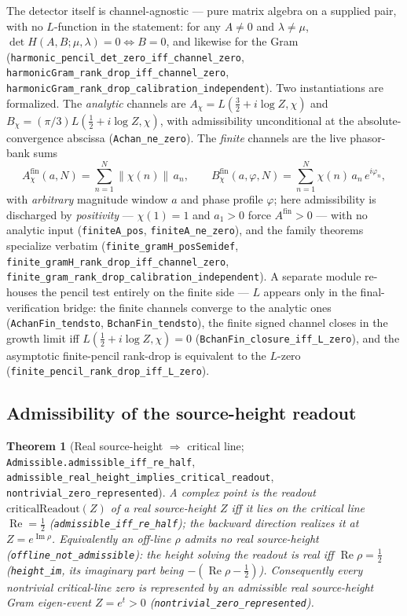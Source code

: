 \documentclass[11pt]{article}
\newtheorem{theorem}[definition]{Theorem}
\DeclareMathOperator{\Ree}{Re}
\DeclareMathOperator{\Imm}{Im}
\newcommand{\code}[1]{\texttt{#1}}
\begin{document}
The detector itself is channel-agnostic --- pure matrix algebra on a supplied pair, with no
$L$-function in the statement: for any $A\neq0$ and $\lambda\neq\mu$,
$\det H(A,B;\mu,\lambda)=0\iff B=0$, and likewise for the Gram
(\code{harmonic\_pencil\_det\_zero\_iff\_channel\_zero},
\code{harmonicGram\_rank\_drop\_iff\_channel\_zero},
\code{harmonicGram\_rank\_drop\_calibration\_independent}).  Two instantiations are formalized.
The \emph{analytic} channels are $A_\chi=L(\tfrac32+i\log Z,\chi)$ and
$B_\chi=(\pi/3)L(\tfrac12+i\log Z,\chi)$, with admissibility unconditional at the
absolute-convergence abscissa (\code{Achan\_ne\_zero}).  The \emph{finite} channels are the live
phasor-bank sums
\[
  A^{\mathrm{fin}}_{\chi}(a,N)=\sum_{n=1}^{N}\|\chi(n)\|\,a_n,\qquad
  B^{\mathrm{fin}}_{\chi}(a,\varphi,N)=\sum_{n=1}^{N}\chi(n)\,a_n\,e^{i\varphi_n},
\]
with \emph{arbitrary} magnitude window $a$ and phase profile $\varphi$; here admissibility is
discharged by \emph{positivity} --- $\chi(1)=1$ and $a_1>0$ force $A^{\mathrm{fin}}>0$ --- with no
analytic input (\code{finiteA\_pos}, \code{finiteA\_ne\_zero}), and the family theorems specialize
verbatim (\code{finite\_gramH\_posSemidef}, \code{finite\_gramH\_rank\_drop\_iff\_channel\_zero},
\code{finite\_gram\_rank\_drop\_calibration\_independent}).  A separate module re-houses the pencil
test entirely on the finite side --- $L$ appears only in the final-verification bridge: the finite
channels converge to the analytic ones (\code{AchanFin\_tendsto}, \code{BchanFin\_tendsto}), the
finite signed channel closes in the growth limit iff $L(\tfrac12+i\log Z,\chi)=0$
(\code{BchanFin\_closure\_iff\_L\_zero}), and the asymptotic finite-pencil rank-drop is equivalent
to the $L$-zero (\code{finite\_pencil\_rank\_drop\_iff\_L\_zero}).

\subsection{Admissibility of the source-height readout}

\begin{theorem}[Real source-height $\Rightarrow$ critical line; \code{Admissible.admissible\_iff\_re\_half}, \code{admissible\_real\_height\_implies\_critical\_readout}, \code{nontrivial\_zero\_represented}]\label{thm:admiss}
A complex point is the readout $\mathrm{criticalReadout}(Z)$ of a real source-height $Z$ \emph{iff} it
lies on the critical line $\Ree=\tfrac12$ (\code{admissible\_iff\_re\_half}); the backward direction
realizes it at $Z=e^{\Imm\rho}$. Equivalently an off-line $\rho$ admits \emph{no} real source-height
(\code{offline\_not\_admissible}): the height solving the readout is real iff $\Ree\rho=\tfrac12$
(\code{height\_im}, its imaginary part being $-(\Ree\rho-\tfrac12)$). Consequently every nontrivial
\emph{critical-line} zero is represented by an admissible real source-height Gram eigen-event
$Z=e^{t}>0$ (\code{nontrivial\_zero\_represented}).
\end{theorem}
\end{document}
